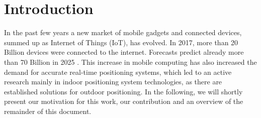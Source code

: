 
\chapter{Introduction} %

\label{Chapter1} %

In the past few years a new market of mobile gadgets and connected devices, summed up as Internet of Things (IoT), has evolved. In 2017, more than 20 Billion devices were connected to the internet. Forecasts predict already more than 70 Billion in 2025 \cite{Statista}. This increase in mobile computing has also increased the demand for accurate real-time positioning systems, which led to an active research mainly in indoor positioning system technologies, as there are established solutions for outdoor positioning.
In the following, we will shortly present our motivation for this work, our contribution and an overview of the remainder of this document.


